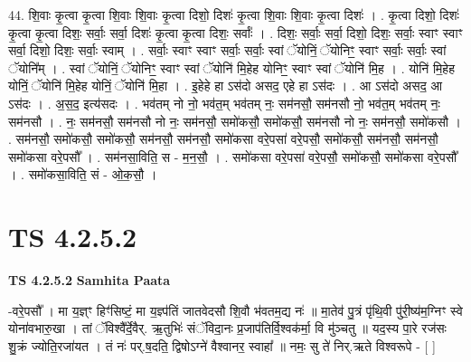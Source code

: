 \documentclass[17pt]{extarticle}
\begin{document}
44. शि॒वाः कृ॒त्वा कृ॒त्वा शि॒वाः शि॒वाः कृ॒त्वा दिशो॒ दिशः॑ कृ॒त्वा शि॒वाः शि॒वाः कृ॒त्वा दिशः॑ । . कृ॒त्वा दिशो॒ दिशः॑ कृ॒त्वा कृ॒त्वा दिशः॒ सर्वाः॒ सर्वा॒ दिशः॑ कृ॒त्वा कृ॒त्वा दिशः॒ सर्वाः᳚ । . दिशः॒ सर्वाः॒ सर्वा॒ दिशो॒ दिशः॒ सर्वाः॒ स्वाꣳ स्वाꣳ सर्वा॒ दिशो॒ दिशः॒ सर्वाः॒ स्वाम् । . सर्वाः॒ स्वाꣳ स्वाꣳ सर्वाः॒ सर्वाः॒ स्वां ॅयोनिं॒ ॅयोनिꣳ॒॒ स्वाꣳ सर्वाः॒ सर्वाः॒ स्वां ॅयोनि᳚म् । . स्वां ॅयोनिं॒ ॅयोनिꣳ॒॒ स्वाꣳ स्वां ॅयोनि॑ मि॒हेह योनिꣳ॒॒ स्वाꣳ स्वां ॅयोनि॑ मि॒ह । . योनि॑ मि॒हेह योनिं॒ ॅयोनि॑ मि॒हेह योनिं॒ ॅयोनि॑ मि॒हा । . इ॒हेहे हा ऽस॑दो असद॒ एहे हा ऽस॑दः । . आ ऽस॑दो असद॒ आ ऽस॑दः । . अ॒स॒द॒ इत्य॑सदः । . भव॑तम् नो नो॒ भव॑त॒म् भव॑तम् नः॒ सम॑नसौ॒ सम॑नसौ नो॒ भव॑त॒म् भव॑तम् नः॒ सम॑नसौ । . नः॒ सम॑नसौ॒ सम॑नसौ नो नः॒ सम॑नसौ॒ समो॑कसौ॒ समो॑कसौ॒ सम॑नसौ नो नः॒ सम॑नसौ॒ समो॑कसौ । . सम॑नसौ॒ समो॑कसौ॒ समो॑कसौ॒ सम॑नसौ॒ सम॑नसौ॒ समो॑कसा वरे॒पसा॑ वरे॒पसौ॒ समो॑कसौ॒ सम॑नसौ॒ सम॑नसौ॒ समो॑कसा वरे॒पसौ᳚ । . सम॑नसा॒विति॒ स - म॒न॒सौ॒ । . समो॑कसा वरे॒पसा॑ वरे॒पसौ॒ समो॑कसौ॒ समो॑कसा वरे॒पसौ᳚ । . समो॑कसा॒विति॒ सं - ओ॒क॒सौ॒ । \newline
\pagebreak
{}

\section{ TS 4.2.5.2 }

\textbf{TS 4.2.5.2 } \newline
\textbf{Samhita Paata} \newline

-वरे॒पसौ᳚ । मा य॒ज्ञ्ꣳ हिꣳ॑सिष्टं॒ मा य॒ज्ञ्प॑तिं जातवेदसौ शि॒वौ भ॑वतम॒द्य नः॑ ॥ मा॒तेव॑ पु॒त्रं पृ॑थि॒वी पु॑री॒ष्य॑म॒ग्निꣳ स्वे योना॑वभारु॒खा । तां ॅविश्वै᳚र्दे॒वैर्. ऋ॒तुभिः॑ संॅविदा॒नः प्र॒जाप॑तिर्वि॒श्वक॑र्मा॒ वि मु॑ञ्चतु ॥ यद॒स्य पा॒रे रज॑सः शु॒क्रं ज्योति॒रजा॑यत । तं नः॑ पर्.ष॒दति॒ द्विषोऽग्ने॑ वैश्वानर॒ स्वाहा᳚ ॥ नमः॒ सु ते॑ निर्.ऋते विश्वरूपे - [  ] \newline
\end{document}
